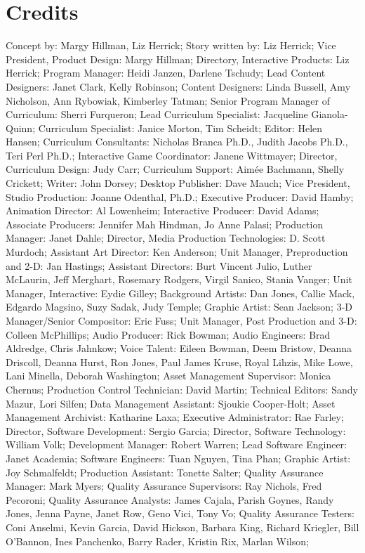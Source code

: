 \section{Credits}
Concept by: Margy Hillman, Liz Herrick;
Story written by: Liz Herrick;
Vice President, Product Design: Margy Hillman;
Directory, Interactive Products: Liz Herrick;
Program Manager: Heidi Janzen, Darlene Tschudy;
Lead Content Designers: Janet Clark, Kelly Robinson;
Content Designers: Linda Bussell, Amy Nicholson, Ann Rybowiak, Kimberley Tatman;
Senior Program Manager of Curriculum: Sherri Furqueron;
Lead Curriculum Specialist: Jacqueline Gianola-Quinn;
Curriculum Specialist: Janice Morton, Tim Scheidt;
Editor: Helen Hansen;
Curriculum Consultants: Nicholas Branca Ph.D., Judith Jacobs Ph.D., Teri Perl Ph.D.;
Interactive Game Coordinator: Janene Wittmayer;
Director, Curriculum Design: Judy Carr;
Curriculum Support: Aimée Bachmann, Shelly Crickett;
Writer: John Dorsey;
Desktop Publisher: Dave Mauch;
Vice President, Studio Production: Joanne Odenthal, Ph.D.;
Executive Producer: David Hamby;
Animation Director: Al Lowenheim;
Interactive Producer: David Adams;
Associate Producers: Jennifer Mah Hindman, Jo Anne Palasi;
Production Manager: Janet Dahle;
Director, Media Production Technologies: D. Scott Murdoch;
Assistant Art Director: Ken Anderson;
Unit Manager, Preproduction and 2-D: Jan Hastings;
Assistant Directors: Burt Vincent Julio, Luther McLaurin, Jeff Merghart, Rosemary Rodgers, Virgil Sanico, Stania Vanger;
Unit Manager, Interactive: Eydie Gilley;
Background Artists: Dan Jones, Callie Mack, Edgardo Magsino, Suzy Sadak, Judy Temple;
Graphic Artist: Sean Jackson;
3-D Manager/Senior Compositor: Eric Fuss;
Unit Manager, Post Production and 3-D: Colleen McPhillips;
Audio Producer: Rick Bowman;
Audio Engineers: Brad Aldredge, Chris Jahnkow;
Voice Talent: Eileen Bowman, Deem Bristow, Deanna Driscoll, Deanna Hurst, Ron Jones, Paul James Kruse, Royal Lihzis, Mike Lowe, Lani Minella, Deborah Washington;
Asset Management Supervisor: Monica Chernus;
Production Control Technician: David Martin;
Technical Editors: Sandy Mazur, Lori Silfen;
Data Management Assistant: Sjoukie Cooper-Holt;
Asset Management Archivist: Katharine Laxa;
Executive Administrator: Rae Farley;
Director, Software Development: Sergio Garcia;
Director, Software Technology: William Volk;
Development Manager: Robert Warren;
Lead Software Engineer: Janet Academia;
Software Engineers: Tuan Nguyen, Tina Phan;
Graphic Artist: Joy Schmalfeldt;
Production Assistant: Tonette Salter;
Quality Assurance Manager: Mark Myers;
Quality Assurance Supervisors: Ray Nichols, Fred Pecoroni;
Quality Assurance Analysts: James Cajala, Parish Goynes, Randy Jones, Jenna Payne, Janet Row, Geno Vici, Tony Vo;
Quality Assurance Testers: Coni Anselmi, Kevin Garcia, David Hickson, Barbara King, Richard Kriegler, Bill O'Bannon, Ines Panchenko, Barry Rader, Kristin Rix, Marlan Wilson;

